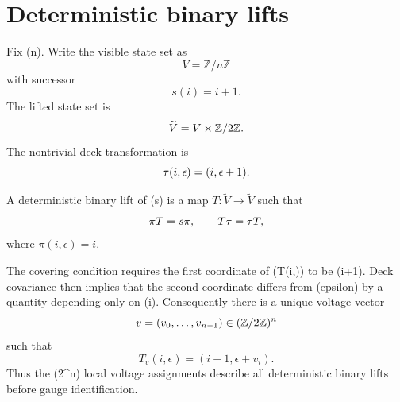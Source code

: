 \section{Deterministic binary lifts}

Fix (n). Write the visible state set as
\[
V=\mathbb Z/n\mathbb Z
\]
with successor
\[
s(i)=i+1.
\]
The lifted state set is
\[
\widetilde V=V\times\mathbb{Z}/2\mathbb{Z}.
\]
The nontrivial deck transformation is
\[
\tau(i,\epsilon)=(i,\epsilon+1).
\]

\begin{definition}
A deterministic binary lift of (s) is a map
\(
T:\widetilde V\to\widetilde V
\)
such that
\[
\pi T=s\pi,
\qquad
T\tau=\tau T,
\]
where \(\pi(i,\epsilon)=i\).
\end{definition}

The covering condition requires the first coordinate of (T(i,\epsilon)) to
be (i+1). Deck covariance then implies that the second coordinate differs
from (epsilon) by a quantity depending only on (i). Consequently there is
a unique voltage vector
\[
v=(v_0,\ldots,v_{n-1})\in(\mathbb{Z}/2\mathbb{Z})^n
\]
such that
\[
T_v(i,\epsilon)=(i+1,\epsilon+v_i).
\]
Thus the (2^n) local voltage assignments describe all deterministic
binary lifts before gauge identification.

